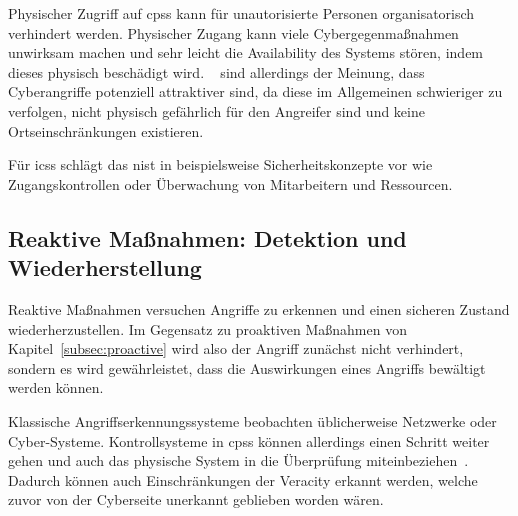 \documentclass[final,bibliography=totocnumbered]{include/sikseminar}
\newcommand{\cps}{\glspl{cps}\xspace}
\begin{document}
    \label{physisch-orga}
    Physischer Zugriff auf \cps kann für unautorisierte Personen organisatorisch verhindert werden.
    Physischer Zugang kann viele Cybergegenmaßnahmen unwirksam machen und sehr leicht die Availability des Systems stören, indem dieses physisch beschädigt wird.
    \citeauthor{CAS08}~\cite{CAS08} sind allerdings der Meinung, dass Cyberangriffe potenziell attraktiver sind, da diese im Allgemeinen schwieriger zu verfolgen, nicht physisch gefährlich für den Angreifer sind und keine Ortseinschränkungen existieren.

    Für \glspl{ics} schlägt das \gls{nist} in \cite{SPL+15} beispielsweise Sicherheitskonzepte vor wie Zugangskontrollen oder Überwachung von Mitarbeitern und Ressourcen.


    \subsection{Reaktive Maßnahmen: Detektion und Wiederherstellung}\label{subsec:reactive}

    Reaktive Maßnahmen versuchen Angriffe zu erkennen und einen sicheren Zustand wiederherzustellen.
    Im Gegensatz zu proaktiven Maßnahmen von Kapitel~\ref{subsec:proactive} wird also der Angriff zunächst nicht verhindert, sondern es wird gewährleistet, dass die Auswirkungen eines Angriffs bewältigt werden können.

    Klassische Angriffserkennungssysteme beobachten üblicherweise Netzwerke oder Cyber-Systeme.
    Kontrollsysteme in \cps können allerdings einen Schritt weiter gehen und auch das physische System in die Überprüfung miteinbeziehen~\cite{CAS+09}.
    Dadurch können auch Einschränkungen der Veracity erkannt werden, welche zuvor von der Cyberseite unerkannt geblieben worden wären.
\end{document}
